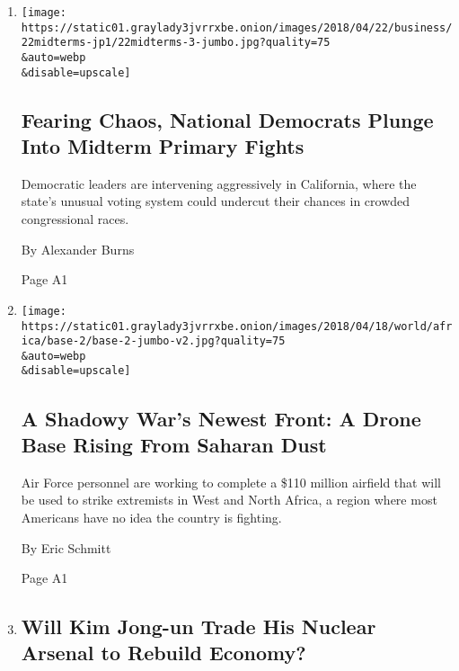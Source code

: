 \begin{enumerate}
\def\labelenumi{\arabic{enumi}.}
\item
  \href{/2018/04/21/us/politics/democrats-house-midterms-california.html}{}

  \texttt{[image: https://static01.graylady3jvrrxbe.onion/images/2018/04/22/business/22midterms-jp1/22midterms-3-jumbo.jpg?quality=75\\\&auto=webp\\\&disable=upscale]}

  \hypertarget{fearing-chaos-national-democrats-plunge-into-midterm-primary-fights}{%
  \subsection{Fearing Chaos, National Democrats Plunge Into Midterm
  Primary
  Fights}\label{fearing-chaos-national-democrats-plunge-into-midterm-primary-fights}}

  Democratic leaders are intervening aggressively in California, where
  the state's unusual voting system could undercut their chances in
  crowded congressional races.

  By Alexander Burns

  Page A1
\item
  \href{/2018/04/22/us/politics/drone-base-niger.html}{}

  \texttt{[image: https://static01.graylady3jvrrxbe.onion/images/2018/04/18/world/africa/base-2/base-2-jumbo-v2.jpg?quality=75\\\&auto=webp\\\&disable=upscale]}

  \hypertarget{a-shadowy-wars-newest-front-a-drone-base-rising-from-saharan-dust}{%
  \subsection{A Shadowy War's Newest Front: A Drone Base Rising From
  Saharan
  Dust}\label{a-shadowy-wars-newest-front-a-drone-base-rising-from-saharan-dust}}

  Air Force personnel are working to complete a \$110 million airfield
  that will be used to strike extremists in West and North Africa, a
  region where most Americans have no idea the country is fighting.

  By Eric Schmitt

  Page A1
\item
  \href{/2018/04/21/world/asia/north-korea-kim-jong-un-nuclear-tests.html}{}

  \hypertarget{will-kim-jong-un-trade-his-nuclear-arsenal-to-rebuild-economy}{%
  \subsection{Will Kim Jong-un Trade His Nuclear Arsenal to Rebuild
  Economy?}\label{will-kim-jong-un-trade-his-nuclear-arsenal-to-rebuild-economy}}


\end{enumerate}
